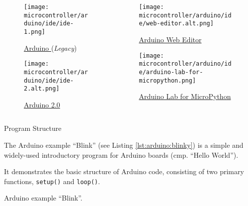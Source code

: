 \documentclass[aspectratio=169]{beamer}
\begin{document}
\begin{frame}
    \begin{columns}
        \begin{column}{0.45\textwidth}
            \begin{figure}
                \texttt{[image: microcontroller/arduino/ide/ide-1.png]}
                \caption{\href{https://www.arduino.cc/en/Guide}{Arduino\textregistered{} } (\textit{Legacy})}
            \end{figure}
            \begin{figure}
                \texttt{[image: microcontroller/arduino/ide/ide-2.alt.png]}
                \caption{\href{https://docs.arduino.cc/software/ide-v2/tutorials/getting-started-ide-v2}{Arduino\textregistered{}  2.0}}
            \end{figure}
        \end{column}
        \begin{column}{0.55\textwidth}
            \begin{figure}
                \texttt{[image: microcontroller/arduino/ide/web-editor.alt.png]}
                \caption{\href{https://docs.arduino.cc/arduino-cloud/getting-started/getting-started-web-editor}{Arduino\textregistered{} Web Editor}}
            \end{figure}
            \begin{figure}
                \texttt{[image: microcontroller/arduino/ide/arduino-lab-for-micropython.png]}
                \caption{\href{https://docs.arduino.cc/micropython/}{Arduino\textregistered{} Lab for MicroPython}}
            \end{figure}
        \end{column}
    \end{columns}
\end{frame}

\begin{frame}{Program Structure}
    \par The Arduino\textregistered{} example ``Blink'' (see Listing \ref{lst:arduino:blinky}) is a simple and widely-used introductory program for Arduino\textregistered{} boards (cmp. ``Hello World'').
    \par It demonstrates the basic structure of Arduino\textregistered{} code, consisting of two primary functions, \texttt{setup()} and \texttt{loop()}.
    \begin{listing}[H]
        \caption{Arduino\textregistered{} example ``Blink''.}
        \label{lst:arduino:blinky}
    \end{listing}
\end{frame}
\end{document}
